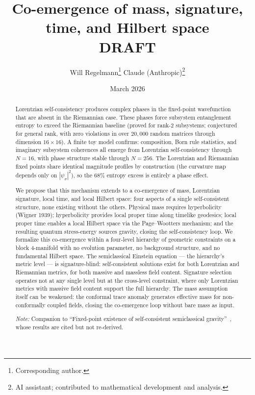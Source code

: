 \documentclass[12pt,a4paper]{article}
\title{\textbf{Co-emergence of mass, signature, time, and Hilbert space}\\[6pt]
{\large DRAFT}}
\author{Will Regelmann\thanks{Corresponding author.} \quad Claude (Anthropic)\thanks{AI
assistant; contributed to mathematical development and analysis.}}
\date{March 2026}
\theoremstyle{definition}
\theoremstyle{remark}
\begin{document}
\maketitle

\begin{abstract}
Lorentzian self-consistency produces complex phases in the fixed-point
wavefunction that are absent in the Riemannian case. These phases force
subsystem entanglement entropy to exceed the Riemannian baseline (proved
for rank-2 subsystems; conjectured for general rank, with zero violations
in over $20{,}000$ random matrices through dimension $16 \times 16$). A finite toy model
confirms: composition, Born rule statistics, and imaginary subsystem
coherences all emerge from Lorentzian self-consistency through $N = 16$,
with phase structure
stable through $N = 256$. The Lorentzian and Riemannian fixed points
share identical magnitude profiles by construction (the curvature map
depends only on $|\psi_\sigma|^2$), so the $68\%$ entropy excess is
entirely a phase effect.

We propose that this mechanism extends to a co-emergence of mass,
Lorentzian signature, local time, and local Hilbert space: four aspects
of a single self-consistent structure, none existing without the others.
Physical mass requires hyperbolicity (Wigner 1939); hyperbolicity
provides local proper time along timelike geodesics; local proper time
enables a local Hilbert space via the Page--Wootters mechanism; and the
resulting quantum stress-energy sources gravity, closing the
self-consistency loop. We formalize this co-emergence within a four-level
hierarchy of geometric constraints on a block 4-manifold with no evolution
parameter, no background structure, and no fundamental Hilbert space.
The semiclassical Einstein equation --- the hierarchy's metric level ---
is signature-blind: self-consistent solutions exist for both Lorentzian
and Riemannian metrics, for both massive and massless field content.
Signature selection operates not at any single level but at the
cross-level constraint, where only Lorentzian metrics with massive field
content support the full hierarchy. The mass assumption itself can be
weakened: the conformal trace anomaly generates effective mass for
non-conformally coupled fields, closing the co-emergence loop without
bare mass as input.

\bigskip\noindent\textit{Note:} Companion to ``Fixed-point existence of
self-consistent semiclassical gravity''~\cite{fixed_point}, whose results
are cited but not re-derived.
\end{abstract}
\end{document}
